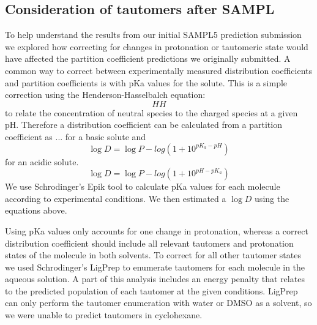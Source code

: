 \subsection{Consideration of tautomers after SAMPL}
\label{methods:3}

To help understand the results from our initial SAMPL5 prediction submission we explored how correcting for changes in protonation or tautomeric state %
would have affected the partition coefficient predictions we originally submitted. 
A common way to correct between experimentally measured distribution coefficients and partition coefficients is with pKa values for the solute. %
This is a simple correction using the Henderson-Hasselbalch %
equation:
\begin{equation}
HH
\label{HH}
\end{equation}
to relate the concentration of neutral species to the charged species at a given pH. 
Therefore a distribution coefficient can be calculated from a partition coefficient as ... 
for a basic solute and 
\begin{equation}
\log D = \log P - log(1+10^{pK_a-pH})
\label{basic}
\end{equation}
for an acidic solute. 
\begin{equation}
\log D = \log P - log(1+10^{pH-pK_a})
\label{acidic}
\end{equation}
We use Schrodinger's %
Epik tool to calculate pKa values for each molecule according to experimental conditions. 
We then estimated a $\log D$ using the equations above. 

Using pKa values only accounts for one change in protonation, whereas a correct distribution coefficient should include all relevant tautomers and protonation states of the molecule in both solvents. 
To correct for all other tautomer states we used Schrodinger's LigPrep to enumerate tautomers for each molecule in the aqueous solution. 
A part of this analysis includes an energy penalty that relates to the predicted population of each tautomer at the given conditions.
LigPrep can only perform the tautomer enumeration with water or DMSO as a solvent, so we were unable to predict tautomers in cyclohexane. 


